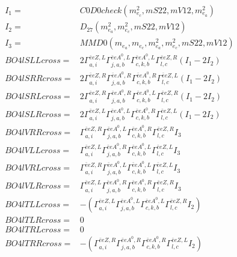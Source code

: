 \documentclass[A4,landscape]{article}
\begin{document}
\begin{align} 
I_1 = & C0D0check(m^2_{e_{{c}}}, mS22, mV12, m^2_{e_{{a}}}) \\ 
I_2 = & D_{27}(m^2_{e_{{a}}}, m^2_{e_{{c}}}, mS22, mV12) \\ 
I_3 = & MMD0(m_{e_{{a}}}, m_{e_{{c}}}, m^2_{e_{{a}}}, m^2_{e_{{c}}}, mS22, mV12) \\ 
  BO4lSLLcross= & 2  \Gamma^{\bar{e}e Z ,L}_{a, i} \Gamma^{\bar{e}e A^0 ,L}_{j, a, b} \Gamma^{\bar{e}e A^0 ,L}_{c, k, b} \Gamma^{\bar{e}e Z ,R}_{l, c} (I_1 - 2 I_2) \\ 
  BO4lSRRcross= & 2  \Gamma^{\bar{e}e Z ,R}_{a, i} \Gamma^{\bar{e}e A^0 ,R}_{j, a, b} \Gamma^{\bar{e}e A^0 ,R}_{c, k, b} \Gamma^{\bar{e}e Z ,L}_{l, c} (I_1 - 2 I_2) \\ 
  BO4lSRLcross= & 2  \Gamma^{\bar{e}e Z ,R}_{a, i} \Gamma^{\bar{e}e A^0 ,R}_{j, a, b} \Gamma^{\bar{e}e A^0 ,L}_{c, k, b} \Gamma^{\bar{e}e Z ,R}_{l, c} (I_1 - 2 I_2) \\ 
  BO4lSLRcross= & 2  \Gamma^{\bar{e}e Z ,L}_{a, i} \Gamma^{\bar{e}e A^0 ,L}_{j, a, b} \Gamma^{\bar{e}e A^0 ,R}_{c, k, b} \Gamma^{\bar{e}e Z ,L}_{l, c} (I_1 - 2 I_2) \\ 
  BO4lVRRcross= &  \Gamma^{\bar{e}e Z ,R}_{a, i} \Gamma^{\bar{e}e A^0 ,L}_{j, a, b} \Gamma^{\bar{e}e A^0 ,R}_{c, k, b} \Gamma^{\bar{e}e Z ,R}_{l, c} I_3 \\ 
  BO4lVLLcross= &  \Gamma^{\bar{e}e Z ,L}_{a, i} \Gamma^{\bar{e}e A^0 ,R}_{j, a, b} \Gamma^{\bar{e}e A^0 ,L}_{c, k, b} \Gamma^{\bar{e}e Z ,L}_{l, c} I_3 \\ 
  BO4lVRLcross= &  \Gamma^{\bar{e}e Z ,R}_{a, i} \Gamma^{\bar{e}e A^0 ,L}_{j, a, b} \Gamma^{\bar{e}e A^0 ,L}_{c, k, b} \Gamma^{\bar{e}e Z ,L}_{l, c} I_3 \\ 
  BO4lVLRcross= &  \Gamma^{\bar{e}e Z ,L}_{a, i} \Gamma^{\bar{e}e A^0 ,R}_{j, a, b} \Gamma^{\bar{e}e A^0 ,R}_{c, k, b} \Gamma^{\bar{e}e Z ,R}_{l, c} I_3 \\ 
  BO4lTLLcross= & -( \Gamma^{\bar{e}e Z ,L}_{a, i} \Gamma^{\bar{e}e A^0 ,L}_{j, a, b} \Gamma^{\bar{e}e A^0 ,L}_{c, k, b} \Gamma^{\bar{e}e Z ,R}_{l, c} I_2) \\ 
  BO4lTLRcross= & 0 \\ 
  BO4lTRLcross= & 0 \\ 
  BO4lTRRcross= & -( \Gamma^{\bar{e}e Z ,R}_{a, i} \Gamma^{\bar{e}e A^0 ,R}_{j, a, b} \Gamma^{\bar{e}e A^0 ,R}_{c, k, b} \Gamma^{\bar{e}e Z ,L}_{l, c} I_2) \\ 
\end{align} 
\end{document}
